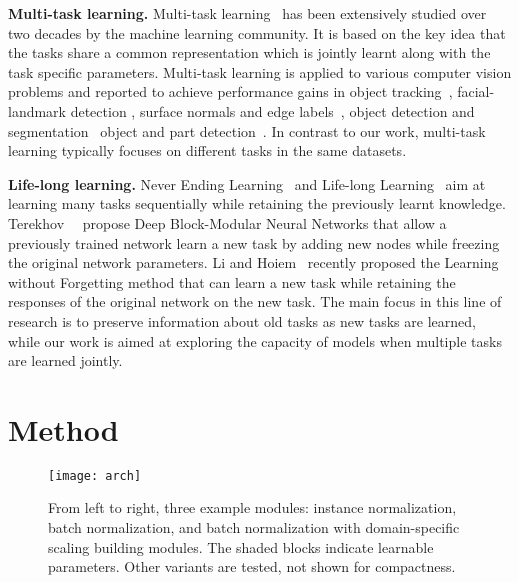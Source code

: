 \documentclass[10pt,twocolumn,letterpaper]{article}
\renewcommand{\paragraph}[1]{\par\medskip\noindent\textbf{#1}}
\begin{document}
\paragraph{Multi-task learning.} Multi-task learning~\cite{caruana97multitask} has been extensively studied over two decades by the machine learning community. It is based on the key idea that the tasks share a common representation which is jointly learnt along with the task specific parameters. Multi-task learning is applied to various computer vision problems and reported to achieve performance gains in object tracking~\cite{Zhang13robust}, facial-landmark detection \cite{zhang14facial}, surface normals and edge labels~\cite{wang2015designing}, object detection and segmentation~\cite{Dai16instance} object and part detection~\cite{bilen16integrated}. In contrast to our work, multi-task learning typically focuses on different tasks in the same datasets.

\paragraph{Life-long learning.} Never Ending Learning~\cite{mitchell2010never} and Life-long Learning~\cite{thrun1998lifelong,silver2013lifelong} aim at learning many tasks sequentially while retaining the previously learnt knowledge. Terekhov~\etal~\cite{terekhov2015knowledge} propose Deep Block-Modular Neural Networks that allow a previously trained network learn a new task by adding new nodes while freezing the original network parameters. Li and Hoiem~\cite{li2016learning} recently proposed the Learning without Forgetting method that can learn a new task while retaining the responses of the original network on the new task. The main focus in this line of research is to preserve information about old tasks as new tasks are learned, while our work is aimed at exploring the capacity of models when multiple tasks are learned jointly.

\section{Method}\label{s:method}


\begin{figure*}[t]
\centering\texttt{[image: arch]}
\caption{From left to right, three example modules: instance normalization, batch normalization, and batch normalization with domain-specific scaling building modules. The shaded blocks indicate learnable parameters. Other variants are tested, not shown for compactness.}\label{f:arch}
\end{figure*}
\end{document}
